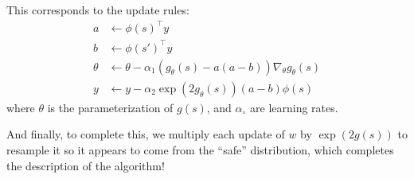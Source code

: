 This corresponds to the update rules:
\begin{align}
  a      & \gets \phi(s)^\top y                                                    \\
  b      & \gets \phi(s')^\top y                                                   \\
  \theta & \gets \theta - \alpha_1 (g_\theta(s) - a(a-b))\nabla_\theta g_\theta(s) \\
  y      & \gets y - \alpha_2 \exp(2 g_\theta(s)) (a-b) \phi(s)
\end{align}
where $\theta$ is the parameterization of $g(s)$, and $\alpha_\circ$ are learning rates.

And finally, to complete this, we multiply each update of $w$ by $\exp(2 g(s))$ to resample it so it appears to come from the ``safe'' distribution, which completes the description of the algorithm!

